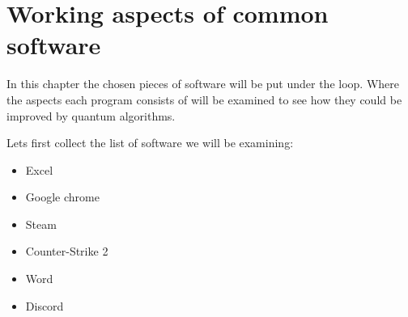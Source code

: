 \section{Working aspects of common software}
\label{sec:processor}

In this chapter the chosen pieces of software will be put under the loop. Where the aspects each program consists of will be examined to see how they could be improved by quantum algorithms.

Lets first collect the list of software we will be examining:
\begin{itemize}
	\item Excel
	\item Google chrome
	\item Steam
	\item Counter-Strike 2
	\item Word
	\item Discord
\end{itemize}

